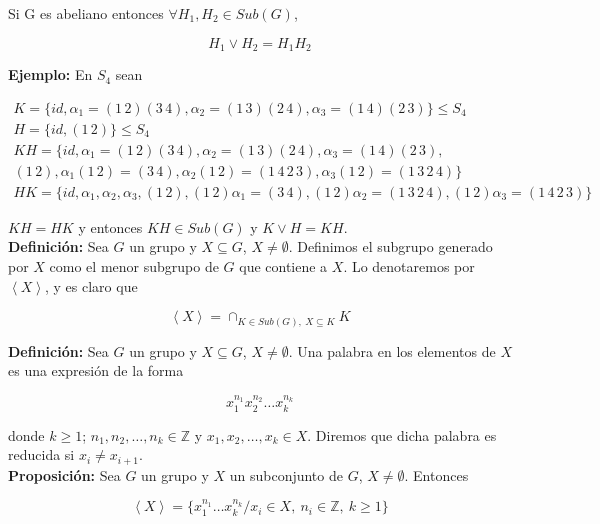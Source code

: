 \documentclass{article}
\begin{document}
Si G es abeliano entonces $\forall H_1,H_2\in Sub(G)$, 

\begin{equation*}
H_1\lor H_2=H_1H_2
\end{equation*}

\textbf{Ejemplo:} En $S_4$ sean

\begin{gather*}
K=\{id,\alpha_1=(1\,2)(3\,4), \alpha_2=(1\,3)(2\,4),\alpha_3=(1\,4)(2\,3)\}\leq S_4 \\
H=\{id,(1\,2)\}\leq S_4 \\
KH=\{id,\alpha_1=(1\,2)(3\,4),\alpha_2=(1\,3)(2\,4),\alpha_3=(1\,4)(2\,3), \\
(1\,2),\alpha_1(1\,2)=(3\,4),\alpha_2(1\,2)=(1\,4\,2\,3),\alpha_3(1\,2)=(1\,3\,2\,4)\} \\
HK=\{id,\alpha_1,\alpha_2,\alpha_3,(1\,2),(1\,2)\alpha_1=(3\,4),(1\,2)\alpha_2=(1\,3\,2\,4),(1\,2)\alpha_3=(1\,4\,2\,3)\} 
\end{gather*}

$KH=HK$ y entonces $KH\in Sub(G)$ y $K\lor H=KH$. \\

\textbf{Definición:} Sea $G$ un grupo y $X\subseteq G$, $X\neq \emptyset$. Definimos el subgrupo generado por $X$ como el menor subgrupo de $G$ que contiene a $X$. Lo denotaremos por $\left\langle X\right\rangle$, y es claro que

\begin{equation*}
\left\langle X \right\rangle = \cap_{K\in Sub(G),\: X\subseteq K}K
\end{equation*}

\textbf{Definición:} Sea $G$ un grupo y $X\subseteq G$, $X\neq \emptyset$. Una palabra en los elementos de $X$ es una expresión de la forma

\begin{equation*}
x_1^{n_1}x_2^{n_2}\ldots x_k^{n_k}
\end{equation*}

donde $k\geq 1$; $n_1,n_2,\ldots,n_k \in \mathbb{Z}$ y $x_1,x_2,\ldots,x_k \in X$. Diremos que dicha palabra es reducida si $x_i\neq x_{i+1}$. \\

\textbf{Proposición:} Sea $G$ un grupo y $X$ un subconjunto de $G$, $X\neq \emptyset$. Entonces 

\begin{equation*}
\left\langle X \right\rangle =
\{x_1^{n_1}\ldots x_k^{n_k} / x_i \in X,\: n_i \in \mathbb{Z},\: k\geq 1\}
\end{equation*}
\end{document}
